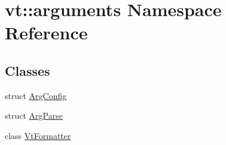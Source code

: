 \hypertarget{namespacevt_1_1arguments}{}\section{vt\+:\+:arguments Namespace Reference}
\label{namespacevt_1_1arguments}
\subsection*{Classes}
\begin{DoxyCompactItemize}
\item 
struct \hyperlink{structvt_1_1arguments_1_1_arg_config}{Arg\+Config}
\item 
struct \hyperlink{structvt_1_1arguments_1_1_arg_parse}{Arg\+Parse}
\item 
class \hyperlink{classvt_1_1arguments_1_1_vt_formatter}{Vt\+Formatter}
\end{DoxyCompactItemize}
